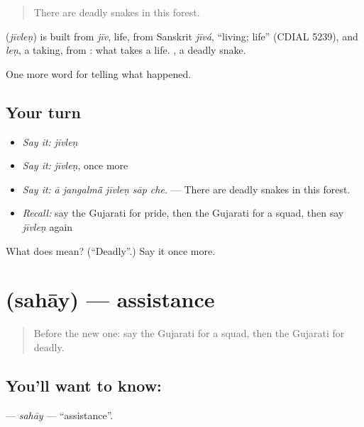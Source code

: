 \begin{quote}
There are deadly snakes in this forest.
\end{quote}

\begin{cousinweb}
\textbf{} (\emph{jīvleṇ}) is built from \emph{jīv}, life, from Sanskrit \emph{jīvá}, \textquotedblleft{}living; life\textquotedblright{} (CDIAL 5239), and \emph{leṇ}, a taking, from \textbf{}: what takes a life. \textbf{ }, a deadly snake.
\end{cousinweb}

\begin{grammarlens}[title={What you've built}]
One more word for telling what happened.
\end{grammarlens}

\subsection*{Your turn}
\begin{itemize}
\raggedright
  \item \emph{Say it:} \emph{jīvleṇ}
  \item \emph{Say it:} \emph{jīvleṇ}, once more
  \item \emph{Say it:} \emph{ā jangalmā̃ jīvleṇ sāp che.} — There are deadly snakes in this forest.
  \item \emph{Recall:} say the Gujarati for pride, then the Gujarati for a squad, then say \emph{jīvleṇ} again
\end{itemize}

\begin{tcolorbox}[breakable,colback=teal!4,colframe=teal!35!black,title={Before you move on}]
What does  mean? (\textquotedblleft{}Deadly\textquotedblright{}.) Say it once more.
\end{tcolorbox}
\section[\texorpdfstring{\gu{સહાય} (sahāy)}{સહાય (sahāy)}]{ (sahāy) — assistance}

\label{lesson:GU-C310-sahay}



\begin{quote}
Before the new one: say the Gujarati for a squad, then the Gujarati for deadly.
\end{quote}

\subsection*{You'll want to know: }
\textbf{} — \emph{sahāy} — \textquotedblleft{}assistance\textquotedblright{}.

